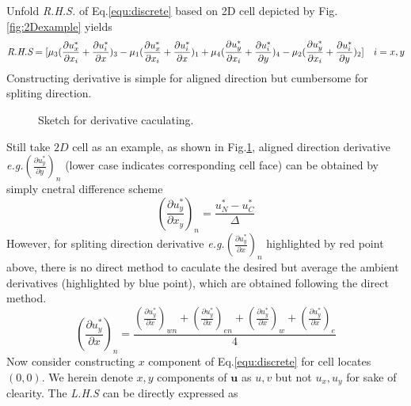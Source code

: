 \documentclass[a4paper]{article}
\begin{document}
Unfold \emph{R.H.S.} of Eq.\ref{equ:discrete} based on 2D cell depicted by Fig.\ref{fig:2Dexample} yields
\begin{equation}\label{equ:2dunfold}
    \emph{R.H.S} = [\mu_3(\frac{\partial u^*_x}{\partial x_i}+\frac{\partial u^*_i}{\partial x})_3 - \mu_1(\frac{\partial u^*_x}{\partial x_i}+\frac{\partial u^*_i}{\partial x})_1+\mu_4(\frac{\partial u^*_y}{\partial x_i}+\frac{\partial u^*_i}{\partial y})_4-\mu_2(\frac{\partial u^*_y}{\partial x_i}+\frac{\partial u^*_i}{\partial y})_2]\quad i = x,y
\end{equation}
 Constructing derivative is simple for aligned direction but cumbersome for spliting direction.
\begin{figure}[H]
    \centering
    \caption{Sketch for derivative caculating.}
    \label{fig:2Dcelld}
\end{figure}
Still take $2D$ cell as an example, as shown in Fig.\ref{fig:2Dcelld}, aligned direction derivative \emph{e.g.}$(\frac{\partial u^*_y}{\partial y})_n$ (lower case indicates corresponding cell face) can be obtained by simply cnetral difference scheme
\begin{equation}
  (\frac{\partial u^*_y}{\partial x_y})_n = \frac{u^*_N-u^*_C}{\Delta}
\end{equation}
However, for spliting direction derivative \emph{e.g.}$(\frac{\partial u^*_y}{\partial x})_n$ highlighted by red point above, there is no direct method to caculate the desired but average the ambient derivatives (highlighted by blue point), which are obtained following the direct method.
\begin{equation}
  (\frac{\partial u^*_y}{\partial x})_n = \frac{ ( \frac{\partial u^*_y}{\partial x})_{wn}+( \frac{\partial u^*_y}{\partial x})_{en}+( \frac{\partial u^*_y}{\partial x})_{w}+( \frac{\partial u^*_y}{\partial x})_{e}}{4}
\end{equation}
Now consider constructing $x$ component of Eq.\ref{equ:discrete} for cell locates $(0,0)$. We herein denote $x,y$ components of $ \mathbf{u}$ as $u,v$ but not $u_x,u_y$ for sake of clearity. The \emph{L.H.S} can be directly expressed as 
\end{document}

